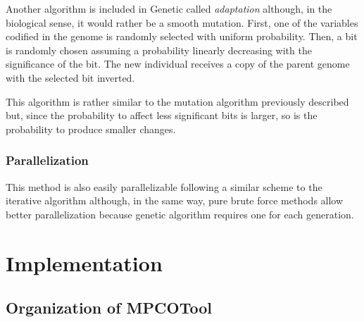 \documentclass[review,authoryear]{elsarticle}
\begin{document}
Another algorithm is included in Genetic called \emph{adaptation} although, in the
biological sense, it would rather be a smooth mutation. First, one of the
variables codified in the genome is randomly selected with uniform probability.
Then, a bit is randomly chosen assuming a probability linearly decreasing with
the significance of the bit. The new individual receives a copy of the parent
genome with the selected bit inverted.

This algorithm is rather similar to the mutation algorithm previously described but, since the probability to affect less significant bits is larger, so is the probability to produce smaller changes.

\subsubsection{Parallelization}

This method is also easily parallelizable following a similar scheme to the
iterative algorithm although, in the same way, pure brute force methods allow
better parallelization because genetic algorithm requires one for each
generation.

\section{Implementation}

\subsection{Organization of MPCOTool}
\end{document}
